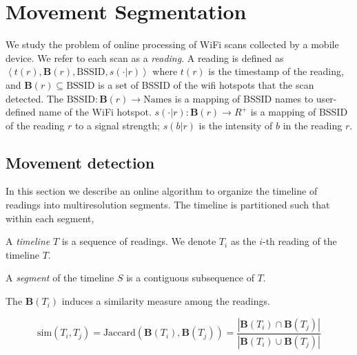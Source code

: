 \newcommand{\bssid}{\mathbf{B}}
\newcommand{\ssid}{\mathrm{BSSID}}
\newcommand{\ssim}{\mathrm{sim}}
\renewcommand{\SS}{\mathbf{S}}
\newcommand{\RR}{\mathbf{R}}
\newcommand{\FF}{\mathbf{F}}
\newcommand{\LL}{\mathbf{L}}
\newcommand{\lleft}{\mathrm{left}}
\newcommand{\rright}{\mathrm{right}}
\newcommand{\RRR}{\hspace{0.4cm}}

\section{Movement Segmentation}

\label{sec:movement}

We study the problem of online processing of WiFi scans collected by a mobile
device.  We refer to each scan as a {\em reading}.
A reading is defined as $\left<t(r), \bssid(r), \ssid, s(\cdot|r)\right>$ where $t(r)$ is
the timestamp of the reading, and $\bssid(r)\subseteq\mathrm{BSSID}$ is a set of
BSSID of the wifi hotspots that the scan detected. 
The $\ssid:\bssid(r)\to\mathrm{Names}$ is a mapping of BSSID names to
user-defined name of the WiFi hotspot.  $s(\cdot|r):\bssid(r)\to R^+$ is a
mapping of BSSID of the reading $r$ to a signal strength; $s(b|r)$ is the
intensity of $b$ in the reading $r$.

\subsection{Movement detection}

In this section we describe an online algorithm to organize the timeline of
readings into multiresolution segments.  The timeline is partitioned such that
within each segment, 

\begin{definition}
    A {\em timeline} $T$ is a sequence of readings.  
    We denote $T_i$ as the $i$-th reading of the timeline $T$.

    A {\em segment} of the timeline $S$ is a contiguous subsequence of $T$.
\end{definition}

The $\bssid(T_i)$ induces a similarity measure among the readings.

\begin{definition}
$$\ssim(T_i, T_j) = \mathrm{Jaccard}(\bssid(T_i), \bssid(T_j))
= \frac{|\bssid(T_i) \cap \bssid(T_j)|}{|\bssid(T_i) \cup \bssid(T_j)|}
$$
\end{definition}

